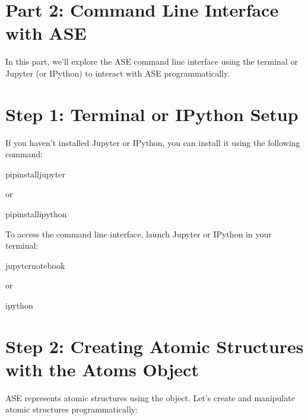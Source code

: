 \documentclass[letterpaper,10pt,english]{sphinxmanual}
\begin{document}
\section{Part 2: Command Line Interface with ASE}
\label{\detokenize{asebasics/asebasics:part-2-command-line-interface-with-ase}}
\sphinxAtStartPar
In this part, we’ll explore the ASE command line interface using the terminal or Jupyter (or IPython) to interact with ASE programmatically.


\section{Step 1: Terminal or IPython Setup}
\label{\detokenize{asebasics/asebasics:step-1-terminal-or-ipython-setup}}
\sphinxAtStartPar
If you haven’t installed Jupyter or IPython, you can install it using the following command:

\begin{sphinxVerbatim}[commandchars=\\\{\}]
pipinstalljupyter
\end{sphinxVerbatim}

\sphinxAtStartPar
or

\begin{sphinxVerbatim}[commandchars=\\\{\}]
pipinstallipython
\end{sphinxVerbatim}

\sphinxAtStartPar
To access the command line interface, launch Jupyter or IPython in your terminal:

\begin{sphinxVerbatim}[commandchars=\\\{\}]
jupyternotebook
\end{sphinxVerbatim}

\sphinxAtStartPar
or

\begin{sphinxVerbatim}[commandchars=\\\{\}]
ipython
\end{sphinxVerbatim}


\section{Step 2: Creating Atomic Structures with the Atoms Object}
\label{\detokenize{asebasics/asebasics:step-2-creating-atomic-structures-with-the-atoms-object}}
\sphinxAtStartPar
ASE represents atomic structures using the  object. Let’s create and manipulate atomic structures programmatically:
\end{document}
